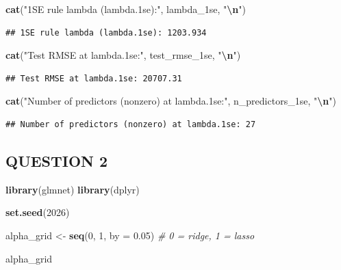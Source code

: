 \documentclass[
]{article}
\newenvironment{Shaded}{\begin{snugshade}}{\end{snugshade}}
\newcommand{\AttributeTok}[1]{\textcolor[rgb]{0.13,0.29,0.53}{#1}}
\newcommand{\CommentTok}[1]{\textcolor[rgb]{0.56,0.35,0.01}{\textit{#1}}}
\newcommand{\DecValTok}[1]{\textcolor[rgb]{0.00,0.00,0.81}{#1}}
\newcommand{\FloatTok}[1]{\textcolor[rgb]{0.00,0.00,0.81}{#1}}
\newcommand{\FunctionTok}[1]{\textcolor[rgb]{0.13,0.29,0.53}{\textbf{#1}}}
\newcommand{\NormalTok}[1]{#1}
\newcommand{\OtherTok}[1]{\textcolor[rgb]{0.56,0.35,0.01}{#1}}
\newcommand{\SpecialCharTok}[1]{\textcolor[rgb]{0.81,0.36,0.00}{\textbf{#1}}}
\newcommand{\StringTok}[1]{\textcolor[rgb]{0.31,0.60,0.02}{#1}}
\begin{document}
\begin{Shaded}
\begin{Highlighting}[]
\FunctionTok{cat}\NormalTok{(}\StringTok{"1SE rule lambda (lambda.1se):"}\NormalTok{, lambda\_1se, }\StringTok{"}\SpecialCharTok{\textbackslash{}n}\StringTok{"}\NormalTok{)}
\end{Highlighting}
\end{Shaded}

\begin{verbatim}
## 1SE rule lambda (lambda.1se): 1203.934
\end{verbatim}

\begin{Shaded}
\begin{Highlighting}[]
\FunctionTok{cat}\NormalTok{(}\StringTok{"Test RMSE at lambda.1se:"}\NormalTok{, test\_rmse\_1se, }\StringTok{"}\SpecialCharTok{\textbackslash{}n}\StringTok{"}\NormalTok{)}
\end{Highlighting}
\end{Shaded}

\begin{verbatim}
## Test RMSE at lambda.1se: 20707.31
\end{verbatim}

\begin{Shaded}
\begin{Highlighting}[]
\FunctionTok{cat}\NormalTok{(}\StringTok{"Number of predictors (nonzero) at lambda.1se:"}\NormalTok{, n\_predictors\_1se, }\StringTok{"}\SpecialCharTok{\textbackslash{}n}\StringTok{"}\NormalTok{)}
\end{Highlighting}
\end{Shaded}

\begin{verbatim}
## Number of predictors (nonzero) at lambda.1se: 27
\end{verbatim}

\subsection{QUESTION 2}\label{question-2}

\begin{Shaded}
\begin{Highlighting}[]
\FunctionTok{library}\NormalTok{(glmnet)}
\FunctionTok{library}\NormalTok{(dplyr)}
\end{Highlighting}
\end{Shaded}

\begin{Shaded}
\begin{Highlighting}[]
\FunctionTok{set.seed}\NormalTok{(}\DecValTok{2026}\NormalTok{)}

\NormalTok{alpha\_grid }\OtherTok{\textless{}{-}} \FunctionTok{seq}\NormalTok{(}\DecValTok{0}\NormalTok{, }\DecValTok{1}\NormalTok{, }\AttributeTok{by =} \FloatTok{0.05}\NormalTok{)  }\CommentTok{\# 0 = ridge, 1 = lasso}

\NormalTok{alpha\_grid}
\end{Highlighting}
\end{Shaded}
\end{document}

